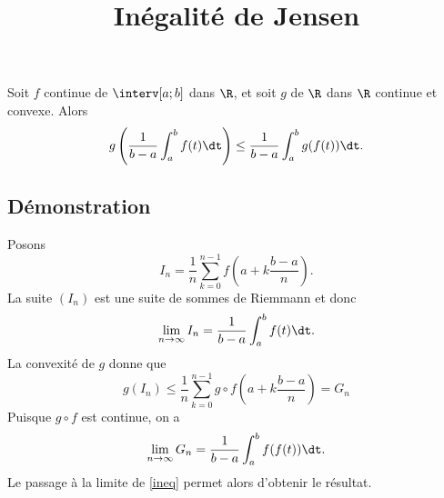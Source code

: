 \documentclass[fontsize=12pt,twoside=false,parskip=half]{scrartcl}
\title{Inégalité de Jensen}
\date{}
\author{}
\begin{document}
\maketitle
   \begin{Theoreme}
      Soit $f$ continue de $\interv[a; b]$ dans $\R$, et soit $g$ de $\R$ dans
      $\R$ continue et convexe. Alors
      \[
         g\left( \frac{1}{b - a} \int_a^b f(t) \dt \right) \leq
         \frac{1}{b - a} \int_a^b g(f(t)) \dt.
      \]
   \end{Theoreme}
   \subsection{Démonstration}
      Posons
      \[
         I_n = \frac{1}{n} \sum_{k = 0}^{n - 1} f\left(a + k \frac{b - a}{n}\right).
      \]
      La suite $(I_n)$ est une suite de sommes de Riemmann et donc
      \[
         \lim_{n \to \infty} I_n = \frac{1}{b - a} \int_a^b f(t) \dt.
      \]
      La convexité de $g$ donne que
      \begin{equation}
         g(I_n) \leq \frac{1}{n} \sum_{k = 0}^{n - 1} g \circ f\left(a + k \frac{b - a}{n}\right) = G_n  \label{ineq}
      \end{equation}
      Puisque $g \circ f$ est continue, on a 
      \[
         \lim_{n \to \infty} G_n = \frac{1}{b - a} \int_a^b f(f(t)) \dt.
      \]
      Le passage à la limite de \eqref{ineq} permet alors d’obtenir le résultat.
\end{document}
